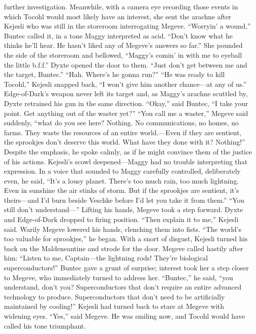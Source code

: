 \documentclass[9pt]{article}
\begin{document}
further investigation.
Meanwhile, with a camera eye recording those events in which Tocohl would most likely have an
interest, she sent the arachne after Kejesli who was still in the storeroom interrogating Megeve.
“Worryin’ a wound,” Buntec called it, in a tone Maggy interpreted as acid. “Don’t know what he
thinks he’ll hear. He hasn’t liked any of Megeve’s answers so far.” She pounded the side of the
storeroom and bellowed, “Maggy’s comin’ in with me to eyeball the little b.f.f.”
Dyxte opened the door to them. “Just don’t get between me and the target, Buntec.”
“Hah. Where’s he gonna run?”
“He was ready to kill Tocohl,” Kejesli snapped back, “I won’t give him another chance—at any of
us.” Edge-of-Dark’s weapon never left its target and, as Maggy’s arachne scuttled by, Dyxte retrained
his gun in the same direction. “Okay,” said Buntec, “I take your point. Get anything out of the waster
yet?”
“You call me a waster,” Megeve said suddenly, “what do you see here? Nothing. No
communications, no homes, no farms. They waste the resources of an entire world.—Even if they are
sentient, the sprookjes don’t deserve this world. What have they done with it? Nothing!” Despite the
emphasis, he spoke calmly, as if he might convince them of the justice of his actions.
Kejesli’s scowl deepened—Maggy had no trouble interpreting that expression. In a voice that
sounded to Maggy carefully controlled, deliberately even, he said, “It’s a lousy planet. There’s too much
rain, too much lightning. Even in sunshine the air stinks of storm. But if the sprookjes are sentient, it’s
theirs—and I’d burn beside Veschke before I’d let you take it from them.”
“You still don’t understand—” Lifting his hands, Megeve took a step forward. Dyxte and
Edge-of-Dark dropped to firing position.
“Then explain it to me,” Kejesli said.
Warily Megeve lowered his hands, clenching them into fists. “The world’s too valuable for
sprookjes,” he began.
With a snort of disgust, Kejesli turned his back on the Maldeneantine and strode for the door.
Megeve called hastily after him: “Listen to me, Captain—the lightning rods! They’re biological
superconductors!”
Buntec gave a grunt of surprise; interest took her a step closer to Megeve, who immediately turned
to address her. “Buntec,” he said, “you understand, don’t you? Superconductors that don’t require an
entire advanced technology to produce. Superconductors that don’t need to be artificially maintained by
cooling!” Kejesli had turned back to stare at Megeve with widening eyes.
“Yes,” said Megeve. He was smiling now, and Tocohl would have called his tone triumphant.
\end{document}
